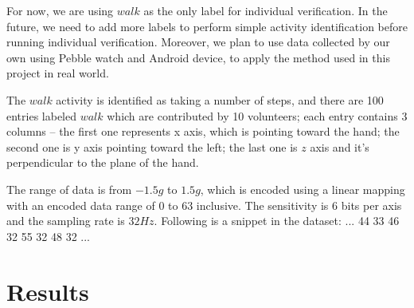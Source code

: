 \documentclass[10pt,twocolumn,letterpaper]{article}
\begin{document}
For now, we are using $walk$ as the only label for individual verification. In the future, we need to add more labels to perform simple activity identification before running individual verification. Moreover, we plan to use data collected by our own using Pebble watch and Android device, to apply the method used in this project in real world.

The $walk$ activity is identified as taking a number of steps, and there are 100 entries labeled $walk$ which are contributed by 10 volunteers; each entry contains 3 columns -- the first one represents x axis, which is pointing toward the hand; the second one is y axis pointing toward the left; the last one is $z$ axis and it’s perpendicular to the plane of the hand.

The range of data is from $-1.5g$ to $1.5g$, which is encoded using a linear mapping with an encoded data range of 0 to 63 inclusive. The sensitivity is 6 bits per axis and the sampling rate is $32Hz$. Following is a snippet in the dataset:\newline
... 44 33 46 32 55 32 48 32\newline
...\newline

\section{Results}
\end{document}

